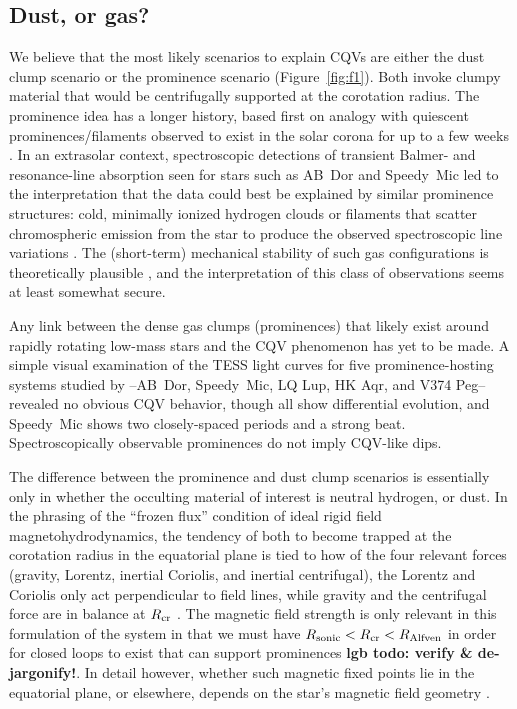 \documentclass[11pt,twocolumn,tighten]{aastex63}
\begin{document}
\subsection{Dust, or gas?}
We believe that the most likely scenarios to explain CQVs
are either the dust clump scenario or the prominence scenario
(Figure~\ref{fig:f1}).  Both invoke clumpy material that would be
centrifugally supported at the corotation radius.  The prominence idea
has a longer history, based first on analogy with quiescent
prominences/filaments observed to exist in the solar corona for up to
a few weeks \citep[see e.g.][]{2015ASSL..415.....V}.  In an extrasolar
context, spectroscopic detections of transient Balmer- and
resonance-line absorption seen for stars such as AB~Dor and Speedy~Mic
\citep[e.g.][]{1989MNRAS.238..657C,1993MNRAS.262..369J,2006MNRAS.365..530D,2016MNRAS.463..965L}
led to the interpretation that the data could best be explained by
similar prominence structures: cold, minimally ionized hydrogen clouds
or filaments that scatter chromospheric emission from the star to
produce the observed spectroscopic line variations
\citep[see][]{1989MNRAS.238..657C}.  The (short-term) mechanical
stability of such gas configurations is theoretically plausible
\citep{2000MNRAS.316..647F,2022MNRAS.514.5465W}, and the
interpretation of this class of observations seems at least somewhat
secure.

Any link between the dense gas clumps (prominences) that likely exist
around rapidly rotating low-mass stars and the CQV phenomenon has
yet to be made.  A simple visual examination of the TESS light curves
for five prominence-hosting systems studied by
\citet{2019MNRAS.482.2853J}--AB~Dor, Speedy~Mic, LQ Lup, HK Aqr, and
V374 Peg--revealed no obvious CQV behavior, though all show
differential evolution, and Speedy~Mic shows two closely-spaced periods
and a strong beat.  Spectroscopically observable prominences 
do not imply CQV-like dips.

The difference between the prominence and dust clump scenarios is
essentially only in whether the occulting material of interest is
neutral hydrogen, or dust.  In the phrasing of the ``frozen flux''
condition of ideal rigid field magnetohydrodynamics, the tendency of
both to become trapped at the corotation radius in the equatorial
plane is tied to how of the four relevant forces (gravity, Lorentz,
inertial Coriolis, and inertial centrifugal), the Lorentz and Coriolis
only act perpendicular to field lines, while gravity and the
centrifugal force are in balance at $R_{\rm cr}$
\citep[see][Sec.~2]{2005MNRAS.357..251T}.  The magnetic field strength
is only relevant in this formulation of the system in that we must
have $R_{\rm sonic} < R_{\rm cr} < R_{\rm Alfven}$ in order for closed
loops to exist that can support prominences
\citep{2019MNRAS.482.2853J} {\bf lgb todo: verify \& de-jargonify!}.
In detail however, whether such magnetic fixed points lie in the
equatorial plane, or elsewhere, depends on the star's magnetic field
geometry \citep{2023MNRAS.518.4734S}.
\end{document}
